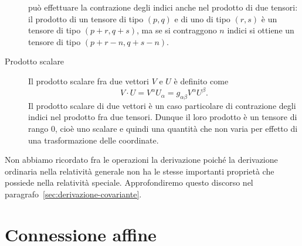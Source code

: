 \begin{description}
  può effettuare la contrazione degli indici anche nel prodotto di due tensori:
  il prodotto di un tensore di tipo $(p,q)$ e di uno di tipo $(r,s)$ è un
  tensore di tipo $(p+r,q+s)$, ma se si contraggono $n$ indici si ottiene un
  tensore di tipo $(p+r-n,q+s-n)$.
\item[Prodotto scalare] Il prodotto scalare fra due vettori $V$ e $U$ è definito
  come
  \begin{equation}
    V\cdot U = V^{\alpha}U_{\alpha} = g_{\alpha\beta}V^{\alpha}U^{\beta}.
  \end{equation}
  Il prodotto scalare di due vettori è un caso particolare di contrazione degli
  indici nel prodotto fra due tensori.  Dunque il loro prodotto è un tensore di
  rango $0$, cioè uno scalare e quindi una quantità che non varia per effetto di
  una trasformazione delle coordinate.
\end{description}

Non abbiamo ricordato fra le operazioni la derivazione poiché la derivazione
ordinaria nella relatività generale non ha le stesse importanti proprietà che
possiede nella relatività speciale.  Approfondiremo questo discorso nel
paragrafo~\ref{sec:derivazione-covariante}.

\section{Connessione affine}
\label{sec:connessione-affine}

